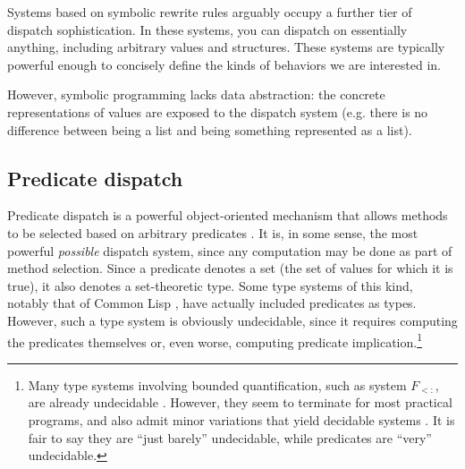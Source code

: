 Systems based on symbolic rewrite rules arguably occupy a further tier of
dispatch sophistication. In these systems, you can dispatch on essentially
anything, including arbitrary values and structures. These systems are
typically powerful enough to concisely define the kinds of behaviors we
are interested in.

However, symbolic programming lacks data abstraction: the concrete
representations of values are exposed to the dispatch system
(e.g. there is no difference between being a list and being something
represented as a list).

\subsection{Predicate dispatch}


Predicate dispatch is a powerful object-oriented mechanism that allows
methods to be selected based on arbitrary predicates \cite{ErnstKC98}.
It is, in some
sense, the most powerful \emph{possible} dispatch system, since any
computation may be done as part of method selection. Since a predicate
denotes a set (the set of values for which it is true), it also denotes
a set-theoretic type. Some type systems of this kind, notably that of
Common Lisp \cite{steele1990common:types}, have actually included predicates as types.
However, such a type system is obviously undecidable, since it
requires computing the predicates themselves or, even worse, computing
predicate implication.\footnote{
Many type systems involving bounded quantification, such as system $F_{<:}$,
are already undecidable \cite{Pierce1994131}.
However, they seem to terminate for most practical programs, and also admit
minor variations that yield decidable systems \cite{Castagna:1994:DBQ:174675.177844}.
It is fair to say they are ``just barely'' undecidable, while predicates
are ``very'' undecidable.
}

